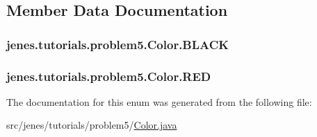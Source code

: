 \subsection{Member Data Documentation}
\hypertarget{enumjenes_1_1tutorials_1_1problem5_1_1_color_a6628df3180f62635a91cb1cd749af195}{
\subsubsection[{B\-L\-A\-C\-K}]{\setlength{\rightskip}{0pt plus 5cm}jenes.\-tutorials.\-problem5.\-Color.\-B\-L\-A\-C\-K}}\label{enumjenes_1_1tutorials_1_1problem5_1_1_color_a6628df3180f62635a91cb1cd749af195}
\hypertarget{enumjenes_1_1tutorials_1_1problem5_1_1_color_a820ec36787044c1681e2768b18a4a38e}{
\subsubsection[{R\-E\-D}]{\setlength{\rightskip}{0pt plus 5cm}jenes.\-tutorials.\-problem5.\-Color.\-R\-E\-D}}\label{enumjenes_1_1tutorials_1_1problem5_1_1_color_a820ec36787044c1681e2768b18a4a38e}


The documentation for this enum was generated from the following file\-:\begin{DoxyCompactItemize}
\item 
src/jenes/tutorials/problem5/\hyperlink{problem5_2_color_8java}{Color.\-java}\end{DoxyCompactItemize}
